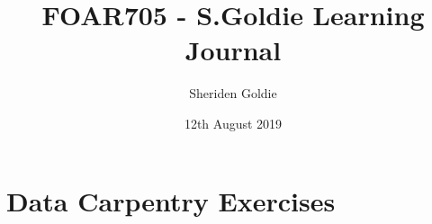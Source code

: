 \documentclass{article}
\title{FOAR705 - S.Goldie Learning Journal}
\author{Sheriden Goldie}
\date{12th August 2019}
\begin{document}
\maketitle

\section{Data Carpentry Exercises}
\end{document}
